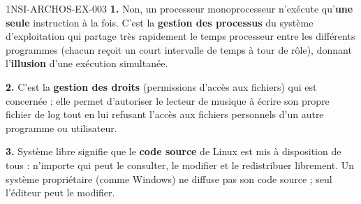 \begin{corrige}{1NSI-ARCHOS-EX-003}
\textbf{1.} Non, un processeur monoprocesseur n'exécute qu'\textbf{une seule} instruction à
la fois. C'est la \textbf{gestion des processus} du système d'exploitation qui partage très
rapidement le temps processeur entre les différents programmes (chacun reçoit un court
intervalle de temps à tour de rôle), donnant l'\textbf{illusion} d'une exécution simultanée.

\textbf{2.} C'est la \textbf{gestion des droits} (permissions d'accès aux fichiers) qui est
concernée : elle permet d'autoriser le lecteur de musique à écrire son propre fichier de log
tout en lui refusant l'accès aux fichiers personnels d'un autre programme ou utilisateur.

\textbf{3.} Système libre signifie que le \textbf{code source} de Linux est mis à
disposition de tous : n'importe qui peut le consulter, le modifier et le redistribuer
librement. Un système propriétaire (comme Windows) ne diffuse pas son code source ; seul
l'éditeur peut le modifier.
\end{corrige}

